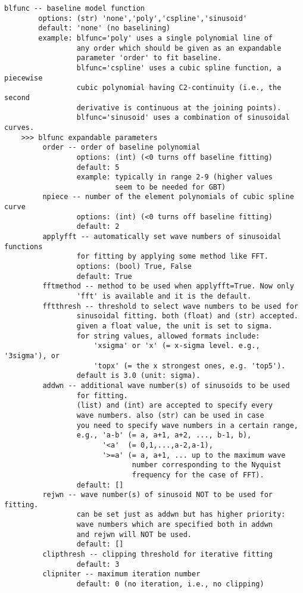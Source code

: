 \begin{verbatim}
blfunc -- baseline model function
        options: (str) 'none','poly','cspline','sinusoid'
        default: 'none' (no baselining)
        example: blfunc='poly' uses a single polynomial line of 
                 any order which should be given as an expandable 
                 parameter 'order' to fit baseline. 
                 blfunc='cspline' uses a cubic spline function, a piecewise 
                 cubic polynomial having C2-continuity (i.e., the second 
                 derivative is continuous at the joining points).
                 blfunc='sinusoid' uses a combination of sinusoidal curves. 
    >>> blfunc expandable parameters
         order -- order of baseline polynomial
                 options: (int) (<0 turns off baseline fitting)
                 default: 5
                 example: typically in range 2-9 (higher values
                          seem to be needed for GBT)
         npiece -- number of the element polynomials of cubic spline curve
                 options: (int) (<0 turns off baseline fitting)
                 default: 2
         applyfft -- automatically set wave numbers of sinusoidal functions
                 for fitting by applying some method like FFT.
                 options: (bool) True, False
                 default: True
         fftmethod -- method to be used when applyfft=True. Now only
                 'fft' is available and it is the default.
         fftthresh -- threshold to select wave numbers to be used for
                 sinusoidal fitting. both (float) and (str) accepted.
                 given a float value, the unit is set to sigma.
                 for string values, allowed formats include:
                     'xsigma' or 'x' (= x-sigma level. e.g., '3sigma'), or
                     'topx' (= the x strongest ones, e.g. 'top5').
                 default is 3.0 (unit: sigma).
         addwn -- additional wave number(s) of sinusoids to be used
                 for fitting.
                 (list) and (int) are accepted to specify every
                 wave numbers. also (str) can be used in case
                 you need to specify wave numbers in a certain range,
                 e.g., 'a-b' (= a, a+1, a+2, ..., b-1, b),
                       '<a'  (= 0,1,...,a-2,a-1),
                       '>=a' (= a, a+1, ... up to the maximum wave
                              number corresponding to the Nyquist
                              frequency for the case of FFT).
                 default: []
         rejwn -- wave number(s) of sinusoid NOT to be used for fitting.
                 can be set just as addwn but has higher priority:
                 wave numbers which are specified both in addwn
                 and rejwn will NOT be used.
                 default: []
         clipthresh -- clipping threshold for iterative fitting
                 default: 3
         clipniter -- maximum iteration number
                 default: 0 (no iteration, i.e., no clipping)


\end{verbatim}
